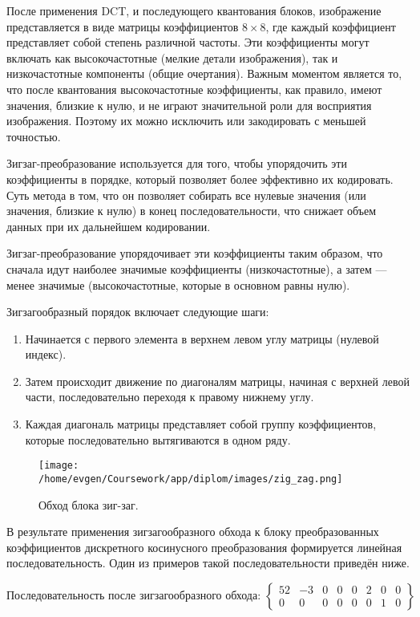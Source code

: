 После применения DCT, и последующего квантования блоков, изображение представляется в виде матрицы коэффициентов $8 \times 8$, 
где каждый коэффициент представляет собой степень различной частоты. 
Эти коэффициенты могут включать как высокочастотные (мелкие детали изображения), так и низкочастотные компоненты (общие очертания). 
Важным моментом является то, что после квантования высокочастотные коэффициенты, как правило, имеют значения, близкие к нулю, 
и не играют значительной роли для восприятия изображения. 
Поэтому их можно исключить или закодировать с меньшей точностью.

Зигзаг-преобразование используется для того, чтобы упорядочить эти коэффициенты в порядке, 
который позволяет более эффективно их кодировать. 
Суть метода в том, что он позволяет собирать все нулевые значения (или значения, близкие к нулю) в конец последовательности, 
что снижает объем данных при их дальнейшем кодировании.

Зигзаг-преобразование упорядочивает эти коэффициенты таким образом, что сначала идут наиболее значимые коэффициенты (низкочастотные), 
а затем — менее значимые (высокочастотные, которые в основном равны нулю).

Зигзагообразный порядок включает следующие шаги:

\begin{enumerate}
    \item Начинается с первого элемента в верхнем левом углу матрицы (нулевой индекс).
    \item Затем происходит движение по диагоналям матрицы, начиная с верхней левой части, последовательно переходя к правому нижнему углу.
    \item Каждая диагональ матрицы представляет собой группу коэффициентов, которые последовательно вытягиваются в одном ряду.
\end{enumerate}


\begin{figure}[h!]
    \centering
    \texttt{[image: /home/evgen/Coursework/app/diplom/images/zig\_zag.png]}
    \caption{Обход блока зиг-заг.}
    \label{fig:zig_zag}
\end{figure}


В результате применения зигзагообразного обхода к блоку преобразованных коэффициентов 
дискретного косинусного преобразования формируется линейная последовательность. Один из примеров такой последовательности приведён ниже.

\begin{equation}
    \label{eq:zigzag_example}
    \text{Последовательность после зигзагообразного обхода: } 
    \left\{
    \begin{array}{cccccccc}
    52 & -3 & 0 & 0 & 0 & 2 & 0 & 0 \\
    0 & 0 & 0 & 0 & 0 & 0 & 1 & 0
    \end{array}
    \right\}
    \end{equation}

